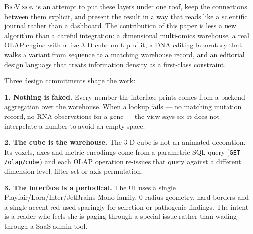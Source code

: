 \documentclass[conference,10pt]{IEEEtran}
\begin{document}
\textsc{BioVision} is an attempt to put these layers under one roof, keep
the connections between them explicit, and present the result in a way
that reads like a scientific journal rather than a dashboard. The
contribution of this paper is less a new algorithm than a careful
integration: a dimensional multi-omics warehouse, a real OLAP engine with
a live 3-D cube on top of it, a DNA editing laboratory that walks a
variant from sequence to a matching warehouse record, and an editorial
design language that treats information density as a first-class
constraint.

Three design commitments shape the work:

\textbf{1. Nothing is faked.} Every number the interface prints comes
from a backend aggregation over the warehouse. When a lookup fails ---
no matching mutation record, no RNA observations for a gene --- the
view says so; it does not interpolate a number to avoid an empty space.

\textbf{2. The cube is the warehouse.} The 3-D cube is not an animated
decoration. Its voxels, axes and metric encodings come from a parametric
SQL query (\texttt{GET /olap/cube}) and each OLAP operation
re-issues that query against a different dimension level, filter set or
axis permutation.

\textbf{3. The interface is a periodical.} The UI uses a single
Playfair/Lora/Inter/JetBrains Mono family, 0-radius geometry, hard
borders and a single accent red used sparingly for selection or
pathogenic findings. The intent is a reader who feels she is paging
through a special issue rather than wading through a SaaS admin tool.
\end{document}
